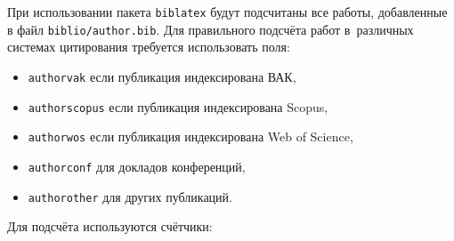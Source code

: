 {\begin{refsection}[bl-author]
        \nocite{Болотин_Карпов_Рашков_Шкурак_2019}%
        \nocite{dream1}%
        \nocite{dream2}%
        \nocite{pseudolabel}
        \nocite{dream1_trudy}%
        \nocite{Дуплякин_Дмитрий_Ондар_Ушаков_2021}%
        \nocite{rumtl}
        \nocite{rutopics}
        \nocite{enmtl}
        \nocite{dp_2023}
    \end{refsection}%
    \ifsynopsis
    \fi
}
\iffalse
При использовании пакета \verb!biblatex! будут подсчитаны все работы, добавленные
в файл \verb!biblio/author.bib!. Для правильного подсчёта работ в~различных
системах цитирования требуется использовать поля:
\begin{itemize}
        \item \texttt{authorvak} если публикация индексирована ВАК,
        \item \texttt{authorscopus} если публикация индексирована Scopus,
        \item \texttt{authorwos} если публикация индексирована Web of Science,
        \item \texttt{authorconf} для докладов конференций,
        \item \texttt{authorother} для других публикаций.
\end{itemize}
Для подсчёта используются счётчики:
